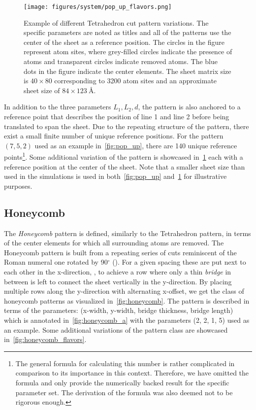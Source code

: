 \begin{figure}[!htb]
  \centering
  \texttt{[image: figures/system/pop\_up\_flavors.png]}
  \caption{Example of different Tetrahedron cut pattern variations. The specific parameters are noted as titles and all of the patterns use the center of the sheet as a reference position. The circles in the figure represent atom sites, where grey-filled circles indicate the presence of atoms and transparent circles indicate removed atoms. The blue dots in the figure indicate the center elements. The sheet matrix size is $40 \times 80$ corresponding to 3200 atom sites and an approximate sheet size of $84 \times \SI{123}{\text{Å}}$.}
  \label{fig:pop_up_flavors}
\end{figure}

In addition to the three parameters $L_1, L_2, d$, the pattern is also anchored
to a reference point that describes the position of line 1 and line 2 before
being translated to span the sheet. Due to the repeating structure of the
pattern, there exist a small finite number of unique reference positions. For
the pattern $(7, 5, 2)$ used as an example in~\cref{fig:pop_up}, there are
140 unique reference points\footnote{The general formula for calculating this number is rather
complicated in comparison to its importance in this context. Therefore, we have
omitted the formula and only provide the numerically backed result for the
specific parameter set. The derivation of the formula was also deemed not to be
rigorous enough.}. Some additional variation of the
pattern is showcased in~\cref{fig:pop_up_flavors} each with a reference position
at the center of the sheet. Note that a smaller sheet size than used in the simulations is used in
both~\cref{fig:pop_up} and~\cref{fig:pop_up_flavors} for illustrative purposes.




\subsection{Honeycomb}
The \textit{Honeycomb} pattern is defined, similarly to the Tetrahedron pattern,
in terms of the center elements for which all surrounding atoms are removed. The
Honeycomb pattern is built from a repeating series of cuts reminiscent of the
Roman numeral one rotated by 90$^{\circ}$
(). For a given spacing
these are put next to each other in the x-direction,
, to achieve a row
where only a thin \textit{bridge} in between is left to connect the sheet
vertically in the y-direction. By placing multiple rows along the y-direction
with alternating x-offset, we get the class of honeycomb patterns as visualized
in~\cref{fig:honeycomb}. The pattern is described in terms of the parameters:
(x-width, y-width, bridge thickness, bridge length) which is annotated
in~\cref{fig:honeycomb_a} with the parameters (2, 2, 1, 5) used as an example.
Some additional variations of the pattern class are showcased
in~\cref{fig:honeycomb_flavors}.


